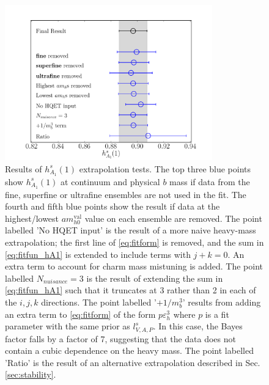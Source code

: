 \begin{figure}[htb!]
  \begin{center}
  \hspace{-18pt}
  \includegraphics[width=0.8\textwidth]{images/BsDsstar/hA1vsmh_fittests.pdf}
  
  \caption{Results of $h_{A_1}^s(1)$ extrapolation tests. The top three blue points show $h_{A_1}^s(1)$ at continuum and physical $b$ mass if data from the fine, superfine or ultrafine ensembles are not used in the fit. The fourth and fifth blue points show the result if data at the highest/lowest $am_{h0}^{\text{val}}$ value on each ensemble are removed. The point labelled 'No HQET input' is the result of a more naive heavy-mass extrapolation; the first line of \eqref{eq:fitform} is removed, and the sum in \eqref{eq:fitfun_hA1} is extended to include terms with $j+k=0$. An extra term to account for charm mass mistuning is added. The point labelled $N_{nuisance}=3$ is the result of extending the sum in \eqref{eq:fitfun_hA1} such that it truncates at 3 rather than 2 in each of the $i,j,k$ directions. The point labelled '$+1/m_b^3$' results from adding an extra term to \eqref{eq:fitform} of the form $p\varepsilon_h^3$ where $p$ is a fit parameter with the same prior as $l_{V,A,P}^s$. In this case, the Bayes factor falls by a factor of 7, suggesting that the data does not contain a cubic dependence on the heavy mass. The point labelled 'Ratio' is the result of an alternative extrapolation described in Sec. \ref{sec:stability}.  \label{fig:fittests}}
    \end{center}
\end{figure}

